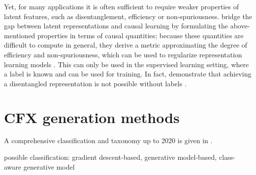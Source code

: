 \documentclass[../main.tex]{subfiles}
\begin{document}
Yet, for many applications it is often sufficient to require weaker properties of latent features, such as disentanglement, efficiency or non-spuriousness.
\citeauthor{wangRepresentation2022} bridge the gap between latent representations and causal learning by formulating the above-mentioned properties in terms of causal quantities; because these quantities are difficult to compute in general, they derive a metric approximating the degree of efficiency and non-spuriousness, which can be used to regularize representation learning models \cite{wangRepresentation2022}.
This can only be used in the supervised learning setting, where a label is known and can be used for training.
In fact, \citeauthor{locatelloChallenging2019} demonstrate that achieving a disentangled representation is not possible without labels \cite{locatelloChallenging2019}.

\section{CFX generation methods}

A comprehensive classification and taxonomy up to 2020 is given in \cite{vermaCounterfactual2020}.




possible classification: gradient descent-based, generative model-based, class-aware generative model \citenote{}

\paragraph{}
\end{document}
